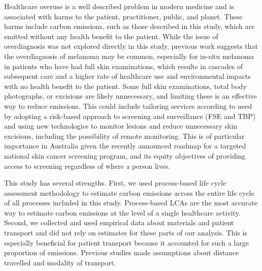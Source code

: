 \begin{refsection}
Healthcare overuse is a well described problem in modern medicine and is associated with harms to the patient, practitioner, public, and planet.\cite{gram_less_2025} These harms include carbon emissions, such as those described in this study, which are emitted without any health benefit to the patient.\cite{barratt_high_2022} While the issue of overdiagnosis was not explored directly in this study, previous work suggests that the overdiagnosis of melanoma may be common, especially for in-situ melanoma in patients who have had full skin examinations, which results in cascades of subsequent care and a higher rate of healthcare use and environmental impacts with no health benefit to the patient.\cite{bell_melanoma_2022} Some full skin examinations, total body photographs, or excisions are likely unnecessary, and limiting these is an effective way to reduce emissions. This could include tailoring services according to need by adopting a risk-based approach to screening and surveillance (FSE and TBP) and using new technologies to monitor lesions and reduce unnecessary skin excisions,\cite{pellacani_effect_2022, smith_implementing_2024} including the possibility of remote monitoring.\cite{drabarek_perspectives_2022} This is of particular importance in Australia given the recently announced roadmap for a targeted national skin cancer screening program, and its equity objectives of providing access to screening regardless of where a person lives.

This study has several strengths. First, we used process-based life cycle assessment methodology to estimate carbon emissions across the entire life cycle of all processes included in this study. Process-based LCAs are the most accurate way to estimate carbon emissions at the level of a single healthcare activity. Second, we collected and used empirical data about materials and patient transport and did not rely on estimates for these parts of our analysis. This is especially beneficial for patient transport because it accounted for such a large proportion of emissions. Previous studies made assumptions about distance travelled and modality of transport.\cite{tan_carbon_2021}


\end{refsection}

